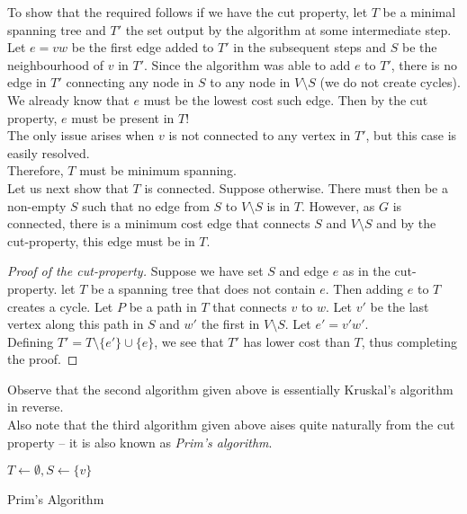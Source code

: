 To show that the required follows if we have the cut property, let $T$ be a minimal spanning tree and $T'$ the set output by the algorithm at some intermediate step.\\
Let $e=vw$ be the first edge added to $T'$ in the subsequent steps and $S$ be the neighbourhood of $v$ in $T'$. Since the algorithm was able to add $e$ to $T'$, there is no edge in $T'$ connecting any node in $S$ to any node in $V\setminus S$ (we do not create cycles). We already know that $e$ must be the lowest cost such edge. Then by the cut property, $e$ must be present in $T$!\\
The only issue arises when $v$ is not connected to any vertex in $T'$, but this case is easily resolved.\\
Therefore, $T$ must be minimum spanning.\\

Let us next show that $T$ is connected. Suppose otherwise. There must then be a non-empty $S$ such that no edge from $S$ to $V\setminus S$ is in $T$. However, as $G$ is connected, there is a minimum cost edge that connects $S$ and $V\setminus S$ and by the cut-property, this edge must be in $T$.

\begin{proof}[Proof of the cut-property]
	Suppose we have set $S$ and edge $e$ as in the cut-property. let $T$ be a spanning tree that does not contain $e$. Then adding $e$ to $T$ creates a cycle. Let $P$ be a path in $T$ that connects $v$ to $w$. Let $v'$ be the last vertex along this path in $S$ and $w'$ the first in $V\setminus S$. Let $e'=v'w'$.\\
	Defining $T' = T\setminus\{e'\}\cup\{e\}$, we see that $T'$ has lower cost than $T$, thus completing the proof. 
\end{proof}

Observe that the second algorithm given above is essentially Kruskal's algorithm in reverse.\\

Also note that the third algorithm given above aises quite naturally from the cut property -- it is also known as \textit{Prim's algorithm}.

\begin{algorithm}
	\DontPrintSemicolon
	\SetNoFillComment
	$T\gets\emptyset, S\gets\{v\}$ 
	\caption{Prim's Algorithm}\label{algo: prim's algorithm}
\end{algorithm}

